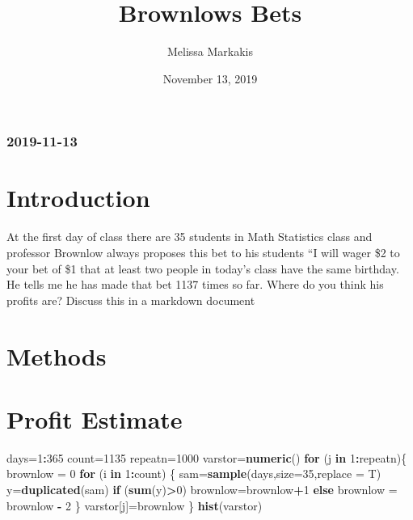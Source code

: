 \documentclass[]{article}
\title{Brownlows Bets}
\author{Melissa Markakis}
\date{November 13, 2019}
\newenvironment{Shaded}{\begin{snugshade}}{\end{snugshade}}
\newcommand{\KeywordTok}[1]{\textcolor[rgb]{0.13,0.29,0.53}{\textbf{#1}}}
\newcommand{\DataTypeTok}[1]{\textcolor[rgb]{0.13,0.29,0.53}{#1}}
\newcommand{\DecValTok}[1]{\textcolor[rgb]{0.00,0.00,0.81}{#1}}
\newcommand{\StringTok}[1]{\textcolor[rgb]{0.31,0.60,0.02}{#1}}
\newcommand{\ControlFlowTok}[1]{\textcolor[rgb]{0.13,0.29,0.53}{\textbf{#1}}}
\newcommand{\OperatorTok}[1]{\textcolor[rgb]{0.81,0.36,0.00}{\textbf{#1}}}
\newcommand{\NormalTok}[1]{#1}
\begin{document}
\maketitle

{
\setcounter{tocdepth}{2}
\tableofcontents
}
\subsubsection{2019-11-13}\label{section}

\section{Introduction}\label{introduction}

At the first day of class there are 35 students in Math Statistics class
and professor Brownlow always proposes this bet to his students ``I will
wager \$2 to your bet of \$1 that at least two people in today's class
have the same birthday. He tells me he has made that bet 1137 times so
far. Where do you think his profits are? Discuss this in a markdown
document

\section{Methods}\label{methods}

\section{Profit Estimate}\label{profit-estimate}

\begin{Shaded}
\begin{Highlighting}[]
\NormalTok{days=}\DecValTok{1}\OperatorTok{:}\DecValTok{365}
\NormalTok{count=}\DecValTok{1135}
\NormalTok{repeatn=}\DecValTok{1000}
\NormalTok{varstor=}\KeywordTok{numeric}\NormalTok{()}
\ControlFlowTok{for}\NormalTok{ (j }\ControlFlowTok{in} \DecValTok{1}\OperatorTok{:}\NormalTok{repeatn)\{}
\NormalTok{brownlow =}\StringTok{ }\DecValTok{0}
\ControlFlowTok{for}\NormalTok{ (i }\ControlFlowTok{in} \DecValTok{1}\OperatorTok{:}\NormalTok{count) \{}
\NormalTok{  sam=}\KeywordTok{sample}\NormalTok{(days,}\DataTypeTok{size=}\DecValTok{35}\NormalTok{,}\DataTypeTok{replace =}\NormalTok{ T)}
\NormalTok{  y=}\KeywordTok{duplicated}\NormalTok{(sam)}
  \ControlFlowTok{if}\NormalTok{ (}\KeywordTok{sum}\NormalTok{(y)}\OperatorTok{>}\DecValTok{0}\NormalTok{) brownlow=brownlow}\OperatorTok{+}\DecValTok{1}
  \ControlFlowTok{else}\NormalTok{ brownlow =}\StringTok{ }\NormalTok{brownlow }\OperatorTok{-}\StringTok{ }\DecValTok{2}
\NormalTok{\}}
\NormalTok{varstor[j]=brownlow}
\NormalTok{\}}
\KeywordTok{hist}\NormalTok{(varstor)}
\end{Highlighting}
\end{Shaded}
\end{document}
